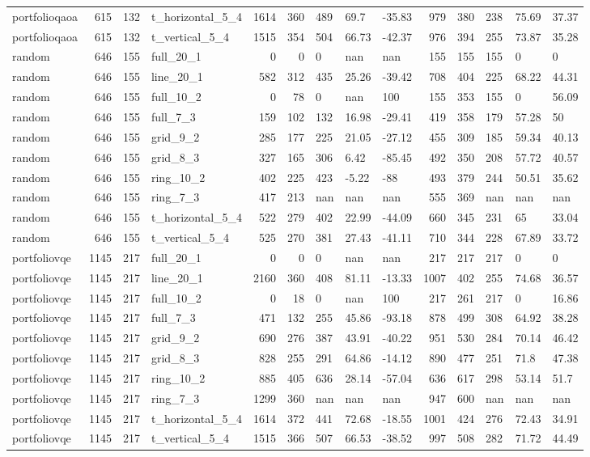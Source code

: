 \begin{longtable}{lrrlrrlllrrlll}
portfolioqaoa & 615 & 132 & t\_horizontal\_5\_4 & 1614 & 360 & 489 & 69.7 & -35.83 & 979 & 380 & 238 & 75.69 & 37.37 \\
portfolioqaoa & 615 & 132 & t\_vertical\_5\_4 & 1515 & 354 & 504 & 66.73 & -42.37 & 976 & 394 & 255 & 73.87 & 35.28 \\
random & 646 & 155 & full\_20\_1 & 0 & 0 & 0 & nan & nan & 155 & 155 & 155 & 0 & 0 \\
random & 646 & 155 & line\_20\_1 & 582 & 312 & 435 & 25.26 & -39.42 & 708 & 404 & 225 & 68.22 & 44.31 \\
random & 646 & 155 & full\_10\_2 & 0 & 78 & 0 & nan & 100 & 155 & 353 & 155 & 0 & 56.09 \\
random & 646 & 155 & full\_7\_3 & 159 & 102 & 132 & 16.98 & -29.41 & 419 & 358 & 179 & 57.28 & 50 \\
random & 646 & 155 & grid\_9\_2 & 285 & 177 & 225 & 21.05 & -27.12 & 455 & 309 & 185 & 59.34 & 40.13 \\
random & 646 & 155 & grid\_8\_3 & 327 & 165 & 306 & 6.42 & -85.45 & 492 & 350 & 208 & 57.72 & 40.57 \\
random & 646 & 155 & ring\_10\_2 & 402 & 225 & 423 & -5.22 & -88 & 493 & 379 & 244 & 50.51 & 35.62 \\
random & 646 & 155 & ring\_7\_3 & 417 & 213 & nan & nan & nan & 555 & 369 & nan & nan & nan \\
random & 646 & 155 & t\_horizontal\_5\_4 & 522 & 279 & 402 & 22.99 & -44.09 & 660 & 345 & 231 & 65 & 33.04 \\
random & 646 & 155 & t\_vertical\_5\_4 & 525 & 270 & 381 & 27.43 & -41.11 & 710 & 344 & 228 & 67.89 & 33.72 \\
portfoliovqe & 1145 & 217 & full\_20\_1 & 0 & 0 & 0 & nan & nan & 217 & 217 & 217 & 0 & 0 \\
portfoliovqe & 1145 & 217 & line\_20\_1 & 2160 & 360 & 408 & 81.11 & -13.33 & 1007 & 402 & 255 & 74.68 & 36.57 \\
portfoliovqe & 1145 & 217 & full\_10\_2 & 0 & 18 & 0 & nan & 100 & 217 & 261 & 217 & 0 & 16.86 \\
portfoliovqe & 1145 & 217 & full\_7\_3 & 471 & 132 & 255 & 45.86 & -93.18 & 878 & 499 & 308 & 64.92 & 38.28 \\
portfoliovqe & 1145 & 217 & grid\_9\_2 & 690 & 276 & 387 & 43.91 & -40.22 & 951 & 530 & 284 & 70.14 & 46.42 \\
portfoliovqe & 1145 & 217 & grid\_8\_3 & 828 & 255 & 291 & 64.86 & -14.12 & 890 & 477 & 251 & 71.8 & 47.38 \\
portfoliovqe & 1145 & 217 & ring\_10\_2 & 885 & 405 & 636 & 28.14 & -57.04 & 636 & 617 & 298 & 53.14 & 51.7 \\
portfoliovqe & 1145 & 217 & ring\_7\_3 & 1299 & 360 & nan & nan & nan & 947 & 600 & nan & nan & nan \\
portfoliovqe & 1145 & 217 & t\_horizontal\_5\_4 & 1614 & 372 & 441 & 72.68 & -18.55 & 1001 & 424 & 276 & 72.43 & 34.91 \\
portfoliovqe & 1145 & 217 & t\_vertical\_5\_4 & 1515 & 366 & 507 & 66.53 & -38.52 & 997 & 508 & 282 & 71.72 & 44.49 \\
\end{longtable}
